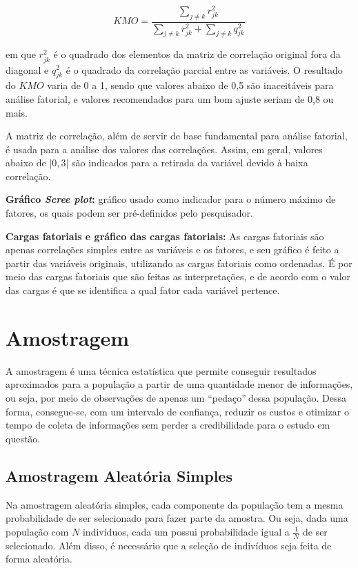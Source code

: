 \documentclass[
  portuguese,
]{estat/estat}
\let\oldsection\section
\renewcommand\section{\clearpage\oldsection}
\begin{document}
\[
KMO = \frac{\sum_{j \neq k} r_{jk}^2}{\sum_{j \neq k} r_{jk}^2 + \sum_{j \neq k} q_{jk}^2}
\]

em que \(r_{jk}^2\) é o quadrado dos elementos da matriz de correlação
original fora da diagonal e \(q_{jk}^2\) é o quadrado da correlação
parcial entre as variáveis. O resultado do \(KMO\) varia de 0 a 1, sendo
que valores abaixo de 0,5 são inaceitáveis para análise fatorial, e
valores recomendados para um bom ajuste seriam de 0,8 ou mais.

A matriz de correlação, além de servir de base fundamental para análise
fatorial, é usada para a análise dos valores das correlações. Assim, em
geral, valores abaixo de \(|0,3|\) são indicados para a retirada da
variável devido à baixa correlação.

\textbf{Gráfico \emph{Scree plot}:} gráfico usado como indicador para o
número máximo de fatores, os quais podem ser pré-definidos pelo
pesquisador.

\textbf{Cargas fatoriais e gráfico das cargas fatoriais:} As cargas
fatoriais são apenas correlações simples entre as variáveis e os
fatores, e seu gráfico é feito a partir das variáveis originais,
utilizando as cargas fatoriais como ordenadas. É por meio das cargas
fatoriais que são feitas as interpretações, e de acordo com o valor das
cargas é que se identifica a qual fator cada variável pertence.

\section{Amostragem}\label{amostragem}

A amostragem é uma técnica estatística que permite conseguir resultados
aproximados para a população a partir de uma quantidade menor de
informações, ou seja, por meio de observações de apenas um
``pedaço''\(\:\)dessa população. Dessa forma, consegue-se, com um
intervalo de confiança, reduzir os custos e otimizar o tempo de coleta
de informações sem perder a credibilidade para o estudo em questão.

\subsection{Amostragem Aleatória
Simples}\label{amostragem-aleatuxf3ria-simples}

Na amostragem aleatória simples, cada componente da população tem a
mesma probabilidade de ser selecionado para fazer parte da amostra. Ou
seja, dada uma população com \(N\) indivíduos, cada um possui
probabilidade igual a \(\frac{1}{N}\) de ser selecionado. Além disso, é
necessário que a seleção de indivíduos seja feita de forma aleatória.
\end{document}
